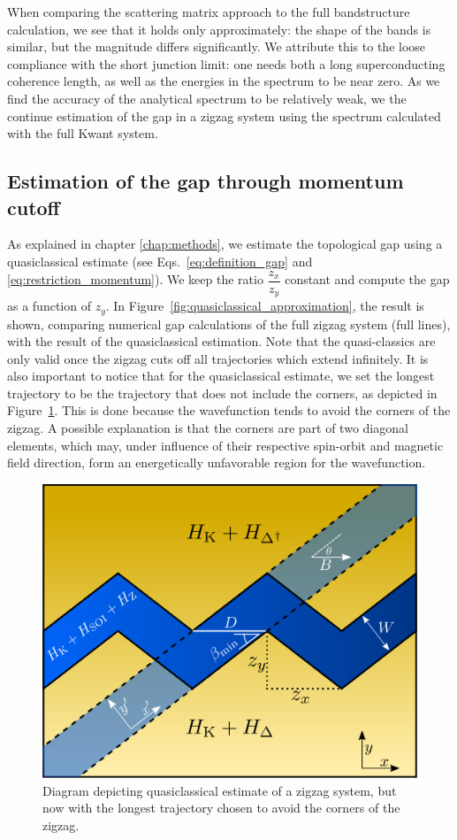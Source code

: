 			When comparing the scattering matrix approach to the full bandstructure calculation, we see that it holds only approximately: the shape of the bands is similar, but the magnitude differs significantly.
			We attribute this to the loose compliance with the short junction limit: one needs both a long superconducting coherence length, as well as the energies in the spectrum to be near zero.
			As we find the accuracy of the analytical spectrum to be relatively weak, we the continue estimation of the gap in a zigzag system using the spectrum calculated with the full Kwant system.

		\subsection{Estimation of the gap through momentum cutoff}
			As explained in chapter \ref{chap:methods}, we estimate the topological gap using a quasiclassical estimate (see Eqs.~\eqref{eq:definition_gap} and \eqref{eq:restriction_momentum}).
			We keep the ratio $\dfrac{z_x}{z_y}$ constant and compute the gap as a function of $z_y$.
			In Figure~\ref{fig:quasiclassical_approximation}, the result is shown, comparing numerical gap calculations of the full zigzag system (full lines), with the result of the quasiclassical estimation.
			Note that the quasi-classics are only valid once the zigzag cuts off all trajectories which extend infinitely.
			It is also important to notice that for the quasiclassical estimate, we set the longest trajectory to be the trajectory that does not include the corners, as depicted in Figure~\ref{fig:longest_trajectory_wo_corners}.
			This is done because the wavefunction tends to avoid the corners of the zigzag.
			A possible explanation is that the corners are part of two diagonal elements, which may, under influence of their respective spin-orbit and magnetic field direction, form an energetically unfavorable region for the wavefunction.


			\begin{figure}
			\centering
			\includegraphics[width=0.75\columnwidth]{images/longest_trajectory_wo_corners}
			\caption{Diagram depicting quasiclassical estimate of a zigzag system, but now with the longest trajectory chosen to avoid the corners of the zigzag.}
			\label{fig:longest_trajectory_wo_corners}
			\end{figure}

